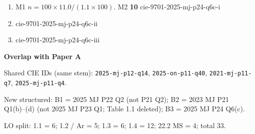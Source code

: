 \documentclass[10pt,a4paper]{article}
\begin{document}
\begin{enumerate}[label=\textbf{(\alph*)}, leftmargin=1.8em]
\item [2] M1 $n=100\times 11.0/(1.1\times 100)$. M2 \textbf{10} \hfill {\footnotesize cie-9701-2025-mj-p24-q6c-i}
\item [1]  \hfill {\footnotesize cie-9701-2025-mj-p24-q6c-ii}
\item [1]  \hfill {\footnotesize cie-9701-2025-mj-p24-q6c-iii}
\end{enumerate}

\vspace{0.35em}
{\normalsize\bfseries Overlap with Paper A}

{\small Shared CIE IDs (same stem): \texttt{2025-mj-p12-q14}, \texttt{2025-on-p11-q40}, \texttt{2021-mj-p11-q7}, \texttt{2025-mj-p11-q4}.}

{\small New structured: B1 = 2025 MJ P22 Q2 (not P21 Q2); B2 = 2023 MJ P21 Q1(b)--(d) (not 2025 MJ P23 Q1; Table 1.1 deleted); B3 = 2025 MJ P24 Q6(c).}

\vspace{0.2em}
{\small LO split: 1.1 = 6; 1.2 / Ar = 5; 1.3 = 6; 1.4 = 12; 22.2 MS = 4; total 33.}
\end{document}
